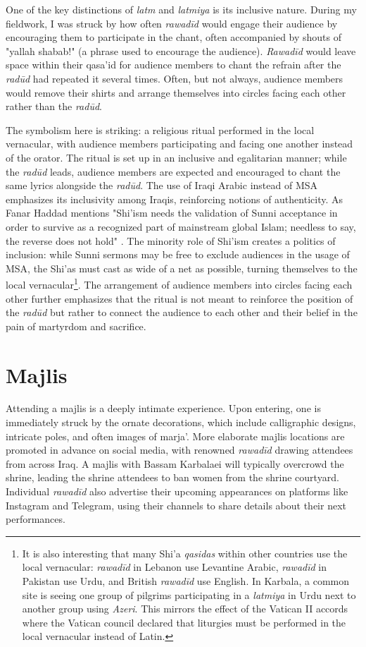 One of the key distinctions of \emph{latm} and \emph{latmiya} is its inclusive nature. During my fieldwork, I was struck by how often \emph{rawadīd} would engage their audience by encouraging them to participate in the chant, often accompanied by shouts of "yallah shabab!" (a phrase used to encourage the audience). \emph{Rawadīd} would leave space within their qasa'id for audience members to chant the refrain after the \emph{radūd} had repeated it several times. Often, but not always, audience members would remove their shirts and arrange themselves into circles facing each other rather than the \emph{radūd}.

The symbolism here is striking: a religious ritual performed in the local vernacular, with audience members participating and facing one another instead of the orator. The ritual is set up in an inclusive and egalitarian manner; while the \emph{radūd} leads, audience members are expected and encouraged to chant the same lyrics alongside the \emph{radūd}. The use of Iraqi Arabic instead of MSA emphasizes its inclusivity among Iraqis, reinforcing notions of authenticity. As Fanar Haddad mentions "Shi'ism needs the validation of Sunni acceptance in order to survive as a recognized part of mainstream global Islam; needless to say, the reverse does not hold" \cite[179]{haddad_understanding_2020}. The minority role of Shi'ism creates a politics of inclusion: while Sunni sermons may be free to exclude audiences in the usage of MSA, the Shi'as must cast as wide of a net as possible, turning themselves to the local vernacular\footnote{It is also interesting that many Shi'a \emph{qasidas} within other countries use the local vernacular: \emph{rawadīd} in Lebanon use Levantine Arabic, \emph{rawadīd} in Pakistan use Urdu, and British \emph{rawadīd} use English. In Karbala, a common site is seeing one group of pilgrims participating in a \emph{latmiya} in Urdu next to another group using \emph{Azeri}. This mirrors the effect of the Vatican II accords where the Vatican council declared that liturgies must be performed in the local vernacular instead of Latin.}. The arrangement of audience members into circles facing each other further emphasizes that the ritual is not meant to reinforce the position of the \emph{radūd} but rather to connect the audience to each other and their belief in the pain of martyrdom and sacrifice.

\section{Majlis}
Attending a majlis is a deeply intimate experience. Upon entering, one is immediately struck by the ornate decorations, which include calligraphic designs, intricate poles, and often images of marja'. More elaborate majlis locations are promoted in advance on social media, with renowned \emph{rawadīd} drawing attendees from across Iraq. A majlis with Bassam Karbalaei will typically overcrowd the shrine, leading the shrine attendees to ban women from the shrine courtyard. Individual \emph{rawadīd} also advertise their upcoming appearances on platforms like Instagram and Telegram, using their channels to share details about their next performances.

